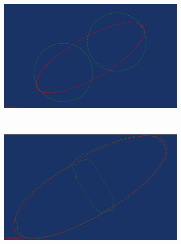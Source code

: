 \documentclass[3p,times]{elsarticle}
\begin{document}
\begin{figure}[ht]
\centering
\begin{subfigure}[b]{0.4\textwidth}
\includegraphics[width=\textwidth]{../picture/circle_ellipse_original_points.png}
\caption{}
\label{fig:circle_ellipse_original_points}
\end{subfigure}
~~~~~~~~~~~~~~~~~~~~~~~~~~~~~~~~~~~~
\begin{subfigure}[b]{0.4\textwidth}
\includegraphics[width=\textwidth]{../picture/circle_ellipse_transformed.png}
\caption{}
\label{fig:circle_ellipse_transformed}
\end{subfigure}


\end{figure}
\end{document}
